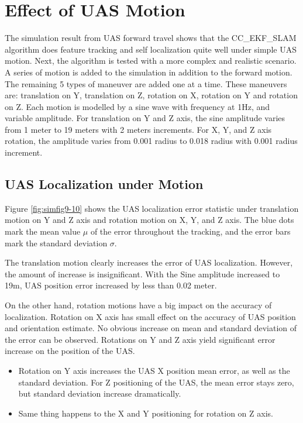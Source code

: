 \section{Effect of UAS Motion}

The simulation result from UAS forward travel shows that the 
CC\_EKF\_SLAM algorithm does feature tracking and self localization 
quite well under simple UAS motion. Next, the algorithm is tested with a 
more complex and realistic scenario. A series of motion is added to the 
simulation in addition to the forward motion. The remaining 5 types of 
maneuver are added one at a time. These maneuvers are: translation on Y, 
translation on Z, rotation on X, rotation on Y and rotation on Z. Each 
motion is modelled by a sine wave with frequency at 1Hz, and variable 
amplitude. For translation on Y and Z axis, the sine amplitude varies 
from 1 meter to 19 meters with 2 meters increments. For X, Y, and Z axis 
rotation, the amplitude varies from 0.001 radius to 0.018 radius with 
0.001 radius increment. 

\subsection{UAS Localization under Motion}

Figure \ref{fig:simfig9-10} shows the UAS localization error statistic
under translation motion on Y and Z axis and rotation motion on X, Y,
and Z axis. The blue dots mark the mean value $\mu$ of the error
throughout the tracking, and the error bars mark the standard
deviation $\sigma$.

The translation motion clearly increases the error of UAS localization. 
However, the amount of increase is insignificant. With the Sine 
amplitude increased to 19m, UAS position error increased by less than 
0.02 meter. 

On the other hand, rotation motions have a big impact on the accuracy of 
localization. Rotation on X axis has small effect on the accuracy of UAS 
position and orientation estimate. No obvious increase on mean and 
standard deviation of the error can be observed. Rotations on Y and Z 
axis yield significant error increase on the position of the UAS. 

\begin{itemize}
  \item Rotation on Y axis increases the UAS X position mean error, as
  well as the standard deviation. For Z positioning of the UAS, the
  mean error stays zero, but standard deviation increase dramatically.
  \item Same thing happens to the X and Y positioning for rotation on
  Z axis.
\end{itemize}

